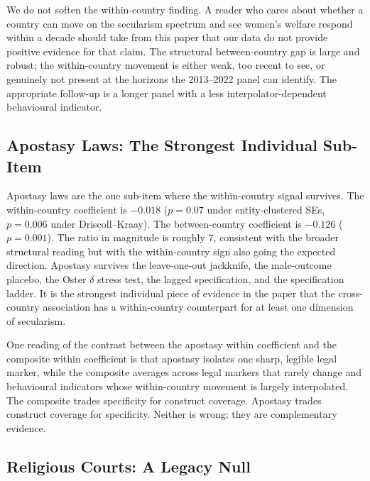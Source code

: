 \documentclass[12pt,a4paper]{article}
\begin{document}
We do not soften the within-country finding. A reader who cares about whether a country can move on the secularism spectrum and see women's welfare respond within a decade should take from this paper that our data do not provide positive evidence for that claim. The structural between-country gap is large and robust; the within-country movement is either weak, too recent to see, or genuinely not present at the horizons the 2013--2022 panel can identify. The appropriate follow-up is a longer panel with a less interpolator-dependent behavioural indicator.

\subsection{Apostasy Laws: The Strongest Individual Sub-Item}

Apostasy laws are the one sub-item where the within-country signal survives. The within-country coefficient is $-0.018$ ($p = 0.07$ under entity-clustered SEs, $p = 0.006$ under Driscoll--Kraay). The between-country coefficient is $-0.126$ ($p = 0.001$). The ratio in magnitude is roughly $7$, consistent with the broader structural reading but with the within-country sign also going the expected direction. Apostasy survives the leave-one-out jackknife, the male-outcome placebo, the Oster $\delta$ stress test, the lagged specification, and the specification ladder. It is the strongest individual piece of evidence in the paper that the cross-country association has a within-country counterpart for at least one dimension of secularism.

One reading of the contrast between the apostasy within coefficient and the composite within coefficient is that apostasy isolates one sharp, legible legal marker, while the composite averages across legal markers that rarely change and behavioural indicators whose within-country movement is largely interpolated. The composite trades specificity for construct coverage. Apostasy trades construct coverage for specificity. Neither is wrong; they are complementary evidence.

\subsection{Religious Courts: A Legacy Null}
\end{document}
